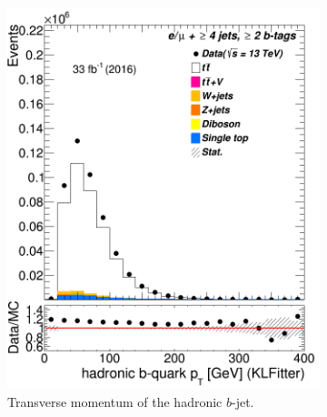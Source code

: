 \begin{figure}
\begin{subfigure}{0.25\textwidth}
		\includegraphics[width=\linewidth]{ControlPlots_emujets_2016_4incl_2incl/klf_bhad_pt_emujets_2016.png}
		\caption{Transverse momentum of the hadronic $b$-jet.} \label{fig:K31}
	\end{subfigure}
\hspace*{0.5cm}
	\begin{subfigure}{0.25\textwidth}

\end{subfigure}
\end{figure}
